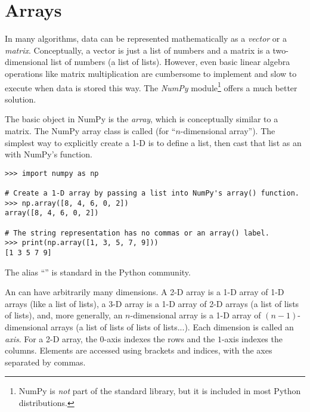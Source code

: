 \label{lab:NumPy}

\section*{Arrays} %

In many algorithms, data can be represented mathematically as a \emph{vector} or a \emph{matrix}.
Conceptually, a vector is just a list of numbers and a matrix is a two-dimensional list of numbers (a list of lists).
However, even basic linear algebra operations like matrix multiplication are cumbersome to implement and slow to execute when data is stored this way.
The \emph{NumPy} module\footnote{NumPy is \emph{not} part of the standard library, but it is included in most Python distributions.} \cite{oliphant2006guide,ascher2001numerical,oliphant2007python} offers a much better solution.

The basic object in NumPy is the \emph{array}, which is conceptually similar to a matrix.
The NumPy array class is called  (for ``$n$-dimensional array'').
The simplest way to explicitly create a 1-D  is to define a list, then cast that list as an  with NumPy's  function.

\begin{lstlisting}
>>> import numpy as np

# Create a 1-D array by passing a list into NumPy's array() function.
>>> np.array([8, 4, 6, 0, 2])
array([8, 4, 6, 0, 2])

# The string representation has no commas or an array() label.
>>> print(np.array([1, 3, 5, 7, 9]))
[1 3 5 7 9]
\end{lstlisting}
%
The alias ``'' is standard in the Python community. %

An  can have arbitrarily many dimensions.
A 2-D array is a 1-D array of 1-D arrays (like a list of lists), a 3-D array is a 1-D array of 2-D arrays (a list of lists of lists), and, more generally, an $n$-dimensional array is a 1-D array of $(n-1)$-dimensional arrays (a list of lists of lists of lists...).
Each dimension is called an \emph{axis}.
For a 2-D array, the $0$-axis indexes the rows and the $1$-axis indexes the columns.
Elements are accessed using brackets and indices, with the axes separated by commas.

